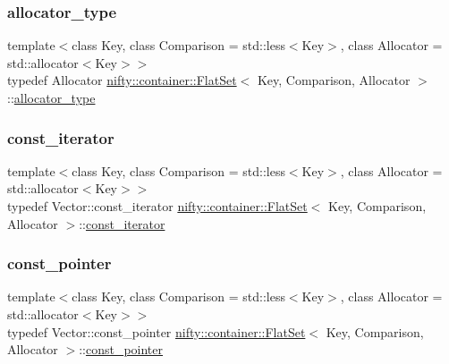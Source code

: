 \subsubsection{\texorpdfstring{allocator\+\_\+type}{allocator\_type}}
{\footnotesize\ttfamily template$<$class Key, class Comparison = std\+::less$<$\+Key$>$, class Allocator = std\+::allocator$<$\+Key$>$$>$ \\
typedef Allocator \hyperlink{classnifty_1_1container_1_1FlatSet}{nifty\+::container\+::\+Flat\+Set}$<$ Key, Comparison, Allocator $>$\+::\hyperlink{classnifty_1_1container_1_1FlatSet_aafc00d7d957c81f01ee8cd5dcabb4c78}{allocator\+\_\+type}}

\mbox{\label{classnifty_1_1container_1_1FlatSet_a0f4cd26da060859b18742abfd534aa24}} 
\subsubsection{\texorpdfstring{const\+\_\+iterator}{const\_iterator}}
{\footnotesize\ttfamily template$<$class Key, class Comparison = std\+::less$<$\+Key$>$, class Allocator = std\+::allocator$<$\+Key$>$$>$ \\
typedef Vector\+::const\+\_\+iterator \hyperlink{classnifty_1_1container_1_1FlatSet}{nifty\+::container\+::\+Flat\+Set}$<$ Key, Comparison, Allocator $>$\+::\hyperlink{classnifty_1_1container_1_1FlatSet_a0f4cd26da060859b18742abfd534aa24}{const\+\_\+iterator}}

\mbox{\label{classnifty_1_1container_1_1FlatSet_a87a82a407ecc181303e62a86b3132e38}} 
\subsubsection{\texorpdfstring{const\+\_\+pointer}{const\_pointer}}
{\footnotesize\ttfamily template$<$class Key, class Comparison = std\+::less$<$\+Key$>$, class Allocator = std\+::allocator$<$\+Key$>$$>$ \\
typedef Vector\+::const\+\_\+pointer \hyperlink{classnifty_1_1container_1_1FlatSet}{nifty\+::container\+::\+Flat\+Set}$<$ Key, Comparison, Allocator $>$\+::\hyperlink{classnifty_1_1container_1_1FlatSet_a87a82a407ecc181303e62a86b3132e38}{const\+\_\+pointer}}

